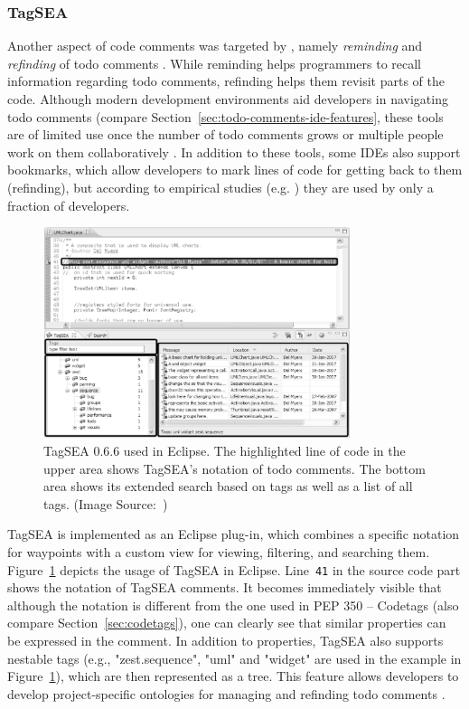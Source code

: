 \subsubsection{TagSEA}
\label{sec:tagsea}
Another aspect of code comments was targeted by \citeauthor{storey_how_2009}, namely \emph{reminding} and \emph{refinding} of todo comments \cite{storey_how_2009}.
While reminding helps programmers to recall information regarding todo comments, refinding helps them revisit parts of the code.
Although modern development environments aid developers in navigating todo comments (compare Section~\ref{sec:todo-comments-ide-features}, these tools are of limited use once the number of todo comments grows or multiple people work on them collaboratively \cite{storey_how_2009}.
In addition to these tools, some IDEs also support bookmarks, which allow developers to mark lines of code for getting back to them (refinding), but according to empirical studies (e.g. \cite{storey_how_2009, storey_todo_2008}) they are used by only a fraction of developers.
%
\begin{figure}[ht]
    \centering
    \includegraphics[width=0.8\textwidth]{images/tagsea}
    \caption{TagSEA 0.6.6 used in Eclipse. The highlighted line of code in the upper area shows TagSEA's notation of todo comments. The bottom area shows its extended search based on tags as well as a list of all tags. (Image Source:~\cite{storey_how_2009})}
    \label{fig:tagsea}
\end{figure}
%
TagSEA is implemented as an Eclipse plug-in, which combines a specific notation for waypoints with a custom view for viewing, filtering, and searching them.
Figure~\ref{fig:tagsea} depicts the usage of TagSEA in Eclipse.
Line~\verb|41| in the source code part shows the notation of TagSEA comments.
It becomes immediately visible that although the notation is different from the one used in PEP 350 -- Codetags (also compare Section~\ref{sec:codetags}), one can clearly see that similar properties can be expressed in the comment.
In addition to properties, TagSEA also supports nestable tags (e.g., "zest.sequence", "uml" and "widget" are used in the example in Figure~\ref{fig:tagsea}), which are then represented as a tree.
This feature allows developers to develop project-specific ontologies for managing and refinding todo comments \cite{storey_how_2009}.


